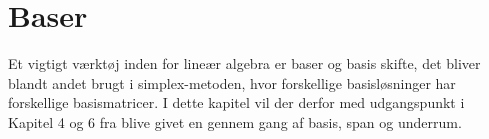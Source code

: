 \chapter{Baser}
Et vigtigt værktøj inden for lineær algebra er baser og basis skifte, det bliver blandt andet brugt i simplex-metoden, hvor forskellige basisløsninger har forskellige basismatricer. 
I dette kapitel vil der derfor med udgangspunkt i Kapitel 4 og 6 fra %
blive givet en gennem gang af basis, span og underrum. 





